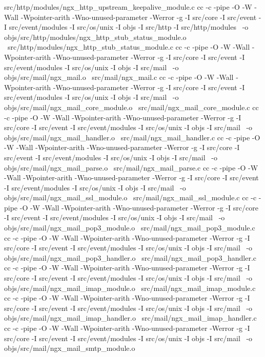 	src/http/modules/ngx_http_upstream_keepalive_module.c
cc -c -pipe  -O -W -Wall -Wpointer-arith -Wno-unused-parameter -Werror -g  -I src/core -I src/event -I src/event/modules -I src/os/unix -I objs -I src/http -I src/http/modules \
	-o objs/src/http/modules/ngx_http_stub_status_module.o \
	src/http/modules/ngx_http_stub_status_module.c
cc -c -pipe  -O -W -Wall -Wpointer-arith -Wno-unused-parameter -Werror -g  -I src/core -I src/event -I src/event/modules -I src/os/unix -I objs -I src/mail \
	-o objs/src/mail/ngx_mail.o \
	src/mail/ngx_mail.c
cc -c -pipe  -O -W -Wall -Wpointer-arith -Wno-unused-parameter -Werror -g  -I src/core -I src/event -I src/event/modules -I src/os/unix -I objs -I src/mail \
	-o objs/src/mail/ngx_mail_core_module.o \
	src/mail/ngx_mail_core_module.c
cc -c -pipe  -O -W -Wall -Wpointer-arith -Wno-unused-parameter -Werror -g  -I src/core -I src/event -I src/event/modules -I src/os/unix -I objs -I src/mail \
	-o objs/src/mail/ngx_mail_handler.o \
	src/mail/ngx_mail_handler.c
cc -c -pipe  -O -W -Wall -Wpointer-arith -Wno-unused-parameter -Werror -g  -I src/core -I src/event -I src/event/modules -I src/os/unix -I objs -I src/mail \
	-o objs/src/mail/ngx_mail_parse.o \
	src/mail/ngx_mail_parse.c
cc -c -pipe  -O -W -Wall -Wpointer-arith -Wno-unused-parameter -Werror -g  -I src/core -I src/event -I src/event/modules -I src/os/unix -I objs -I src/mail \
	-o objs/src/mail/ngx_mail_ssl_module.o \
	src/mail/ngx_mail_ssl_module.c
cc -c -pipe  -O -W -Wall -Wpointer-arith -Wno-unused-parameter -Werror -g  -I src/core -I src/event -I src/event/modules -I src/os/unix -I objs -I src/mail \
	-o objs/src/mail/ngx_mail_pop3_module.o \
	src/mail/ngx_mail_pop3_module.c
cc -c -pipe  -O -W -Wall -Wpointer-arith -Wno-unused-parameter -Werror -g  -I src/core -I src/event -I src/event/modules -I src/os/unix -I objs -I src/mail \
	-o objs/src/mail/ngx_mail_pop3_handler.o \
	src/mail/ngx_mail_pop3_handler.c
cc -c -pipe  -O -W -Wall -Wpointer-arith -Wno-unused-parameter -Werror -g  -I src/core -I src/event -I src/event/modules -I src/os/unix -I objs -I src/mail \
	-o objs/src/mail/ngx_mail_imap_module.o \
	src/mail/ngx_mail_imap_module.c
cc -c -pipe  -O -W -Wall -Wpointer-arith -Wno-unused-parameter -Werror -g  -I src/core -I src/event -I src/event/modules -I src/os/unix -I objs -I src/mail \
	-o objs/src/mail/ngx_mail_imap_handler.o \
	src/mail/ngx_mail_imap_handler.c
cc -c -pipe  -O -W -Wall -Wpointer-arith -Wno-unused-parameter -Werror -g  -I src/core -I src/event -I src/event/modules -I src/os/unix -I objs -I src/mail \
	-o objs/src/mail/ngx_mail_smtp_module.o \
